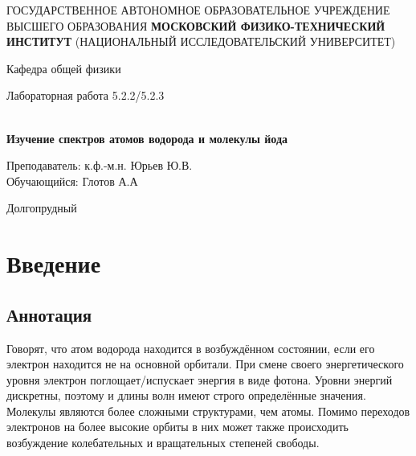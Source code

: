 \documentclass[12pt,a4paper]{article}
\author{Глотов Алексей}
\begin{document}
\newpage
\begin{center}
\footnotesize{{ГОСУДАРСТВЕННОЕ АВТОНОМНОЕ ОБРАЗОВАТЕЛЬНОЕ УЧРЕЖДЕНИЕ}\break
{ВЫСШЕГО ОБРАЗОВАНИЯ}
\break
{\bf {МОСКОВСКИЙ ФИЗИКО-ТЕХНИЧЕСКИЙ ИНСТИТУТ}}
\break
\small{(НАЦИОНАЛЬНЫЙ ИССЛЕДОВАТЕЛЬСКИЙ УНИВЕРСИТЕТ)}}
\break
\hfill \break
\hfill \break
\begin{center}
\normalsize{Кафедра общей физики}
\end{center}
\hfill \break
\hfill \break
\hfill \break
\hfill \break

\begin{center}
\normalsize {Лабораторная работа 5.2.2/5.2.3}
\end{center}
\hfill \break\\
\large{\textbf{Изучение спектров атомов водорода и молекулы йода}}
\end{center}
\begin{flushleft}
\hfill \break
\hfill \break
\hfill \break
\hfill \break
\hfill \break
\hfill \break
\hfill \break
\hfill \break
\hfill \break
\hfill \break
\hangindent=10cm
\normalsize{Преподаватель:} \;\;\;\;
\normalsize{к.ф.-м.н. Юрьев Ю.В.}\\
\hfill \break
\normalsize{Обучающийся:} \;\;\;\;\;
\normalsize{Глотов А.А} \\
\hfill \break
\end{flushleft}
\hfill \break
\hfill \break
\hfill \break
\hfill \break
\hfill \break
\hfill \break
\hfill \break
\hfill \break
\hfill \break
\hfill \break
\hfill \break

\begin{center}
Долгопрудный 
\end{center}

\thispagestyle{empty}


\newpage
\section{Введение}

\subsection{Аннотация}

	Говорят, что атом водорода находится в возбуждённом состоянии, если его электрон находится не на основной орбитали. При смене своего энергетического уровня электрон поглощает/испускает энергия в виде фотона. Уровни энергий дискретны, поэтому и длины волн имеют строго определённые значения.
     Молекулы являются более сложными структурами, чем атомы. Помимо переходов электронов на более высокие орбиты в них может также происходить возбуждение колебательных и вращательных степеней свободы.
\end{document}
